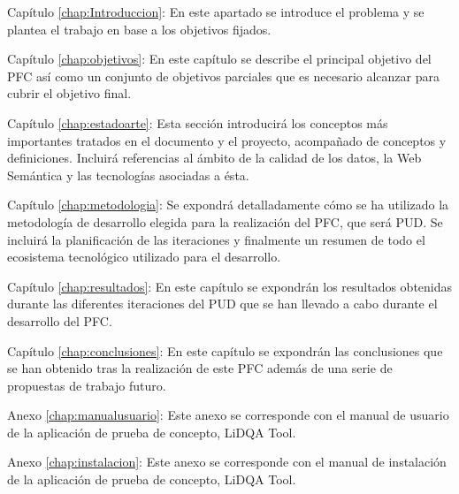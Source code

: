 \begin{definitionlist}
\item[Capítulo \ref{chap:Introduccion}: \nameref{chap:Introduccion}] En este
  apartado se introduce el problema y se plantea el trabajo en base a los
  objetivos fijados. 


\item[Capítulo \ref{chap:objetivos}: \nameref{chap:objetivos}] En este capítulo
  se describe el principal objetivo del \acs{PFC} así como un conjunto de
  objetivos parciales que es necesario alcanzar para cubrir el objetivo
  final. 

\item[Capítulo \ref{chap:estadoarte}: \nameref{chap:estadoarte}] Esta sección
  introducirá los conceptos más importantes tratados en el documento y el
  proyecto, acompañado de conceptos y definiciones. Incluirá referencias al
  ámbito de la calidad de los datos, la Web Semántica y las tecnologías
  asociadas a ésta. 

\item[Capítulo \ref{chap:metodologia}: \nameref{chap:metodologia}] Se expondrá
  detalladamente cómo se ha utilizado la metodología de desarrollo elegida para la realización del \acs{PFC}, que
  será \acf{PUD}. Se incluirá la planificación de las iteraciones y finalmente
  un resumen de todo el ecosistema tecnológico utilizado para el desarrollo.

\item[Capítulo \ref{chap:resultados}: \nameref{chap:resultados}] En este
  capítulo se expondrán los resultados obtenidas durante las diferentes
  iteraciones del \acs{PUD} que se han llevado a cabo durante el desarrollo del
  \acs{PFC}. 

\item[Capítulo \ref{chap:conclusiones}: \nameref{chap:conclusiones}] En este
  capítulo se expondrán las conclusiones que se han obtenido tras la realización
  de este \acs{PFC} además de una serie de propuestas de trabajo futuro. 

\item[Anexo \ref{chap:manualusuario}: \nameref{chap:manualusuario}] Este anexo
  se corresponde con el manual de usuario de la aplicación de prueba de
  concepto, LiDQA Tool. 

\item[Anexo \ref{chap:instalacion}: \nameref{chap:instalacion}] Este anexo
  se corresponde con el manual de instalación de la aplicación de prueba de
  concepto, LiDQA Tool. 


\end{definitionlist}
